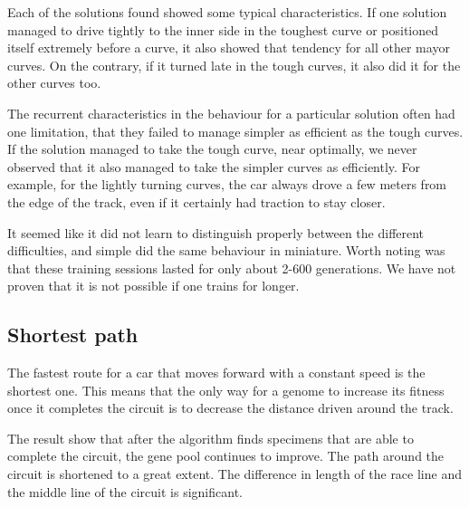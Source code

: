 Each of the solutions found showed some typical characteristics. If one solution managed to drive tightly to the inner side in the toughest curve or positioned itself extremely before a curve, it also showed that tendency for all other mayor curves. On the contrary, if it turned late in the tough curves, it also did it for the other curves too.

The recurrent characteristics in the behaviour for a particular solution often had one limitation, that they failed to manage simpler as efficient as the tough curves. If the solution managed to take the tough curve, near optimally, we never observed that it also managed to take the simpler curves as efficiently. For example, for the lightly turning curves, the car always drove a few meters from the edge of the track, even if it certainly had traction to stay closer. 

It seemed like it did not learn to distinguish properly between the different difficulties, and simple did the same behaviour in miniature. Worth noting was that these training sessions lasted for only about 2-600 generations. We have not proven that it is not possible if one trains for longer.



\subsection{Shortest path}

The fastest route for a car that moves forward with a constant speed is the shortest one. This means that the only way for a genome to increase its fitness once it completes the circuit is to decrease the distance driven around the track.  

The result show that after the algorithm finds specimens that are able to complete the circuit, the gene pool continues to improve. The path around the circuit is shortened to a great extent. The difference in length of the race line and the middle line of the circuit is significant. 

